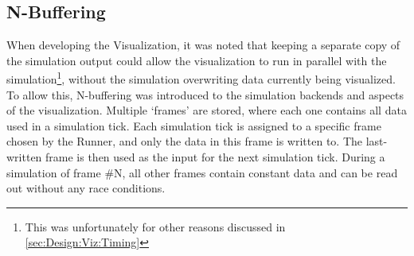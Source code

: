 
\subsection{N-Buffering}\label{sec:DesignSimNBuffer}
When developing the Visualization, it was noted that keeping a separate copy of the simulation output could allow the visualization to run in parallel with the simulation\footnote{This was unfortunately for other reasons discussed in \cref{sec:Design:Viz:Timing}}, without the simulation overwriting data currently being visualized.
To allow this, N-buffering was introduced to the simulation backends and aspects of the visualization.
Multiple `frames' are stored, where each one contains all data used in a simulation tick.
Each simulation tick is assigned to a specific frame chosen by the Runner, and only the data in this frame is written to.
The last-written frame is then used as the input for the next simulation tick.
During a simulation of frame \#N, all other frames contain constant data and can be read out without any race conditions.

